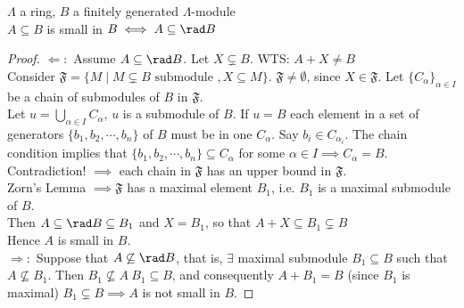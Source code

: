 \begin{prop}
\label{prop:41.25}
$\Lambda$ a ring, $B$ a finitely generated $\Lambda$-module\\
$A \subseteq B$ is small in $B \iff A \subseteq \rad B$
\begin{proof}
$\Leftarrow :$ Assume $A \subseteq \rad B$. Let $X \subsetneq B$. WTS: $A+X \neq B$\\
Consider $\mathfrak{F} = \{ M \mid M \subsetneq B \text{ submodule }, X \subseteq M \}$. $\mathfrak{F} \neq \emptyset$, since $X \in \mathfrak{F}$. Let $\{ C_\alpha \}_{\alpha \in I}$ be a chain of submodules  of $B$ in $\mathfrak{F}$.\\ Let $u = \bigcup_{\alpha \in I} C_\alpha$, $u$ is a submodule of $B$. If $u = B$ each element in a set of generators $\{ b_1, b_2, \cdots, b_n \}$ of $B$ must be in one $C_\alpha$. Say $b_i \in C_{\alpha_i}$. The chain condition implies that $\{ b_1, b_2, \cdots, b_n \} \subseteq C_\alpha$ for some $\alpha \in I \implies C_\alpha = B$. Contradiction! $\implies$ each chain in $\mathfrak{F}$ has an upper bound in $\mathfrak{F}$.\\
Zorn's Lemma $\implies \mathfrak{F}$ has a maximal element $B_1$, i.e. $B_1$ is a maximal submodule of $B$.\\
Then $A \subseteq \rad B \subseteq B_1$ and $X=B_1$, so that $A+X \subseteq B_1 \subsetneq B$\\
Hence $A$ is small in $B$.\\
$\Rightarrow :$ Suppose that $A \not\subseteq \rad B$, that is, $\exists $ maximal submodule $B_1 \subseteq B$ such that $A \not\subseteq B_1$. Then $B_1 \not\subseteq A \ B_1 \subseteq B$, and consequently $A+B_1 = B$ (since $B_1$ is maximal) $B_1 \subsetneq B \implies A$ is not small in $B$.
\end{proof}
\end{prop}

